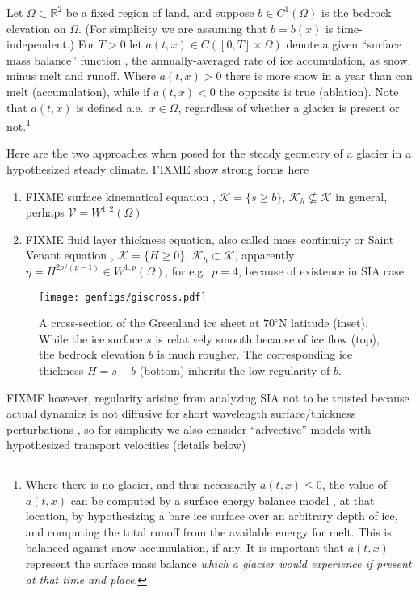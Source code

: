 \documentclass[hidelinks,onefignum,onetabnum,final]{siamart220329}  %
\newcommand{\RR}{\mathbb{R}}
\newcommand{\cK}{\mathcal{K}}
\newcommand{\cV}{\mathcal{V}}
\begin{document}
Let $\Omega \subset \RR^2$ be a fixed region of land, and suppose $b \in C^1(\Omega)$ is the bedrock elevation on $\Omega$.  (For simplicity we are assuming that $b=b(x)$ is time-independent.)  For $T>0$ let $a(t,x) \in C([0,T] \times \Omega)$ denote a given ``surface mass balance'' function \cite{GreveBlatter2009}, the annually-averaged rate of ice accumulation, as snow, minus melt and runoff.  Where $a(t,x)>0$ there is more snow in a year than can melt (accumulation), while if $a(t,x)<0$ the opposite is true (ablation).  Note that $a(t,x)$ is defined a.e.~$x\in \Omega$, regardless of whether a glacier is present or not.\footnote{Where there is no glacier, and thus necessarily $a(t,x) \le 0$, the value of $a(t,x)$ can be computed by a surface energy balance model \cite{GreveBlatter2009}, at that location, by hypothesizing a bare ice surface over an arbitrary depth of ice, and computing the total runoff from the available energy for melt.  This is balanced against snow accumulation, if any.  It is important that $a(t,x)$ represent the surface mass balance \emph{which a glacier would experience if present at that time and place}.}

Here are the two approaches when posed for the steady geometry of a glacier in a hypothesized steady climate.  FIXME show strong forms here

\begin{enumerate}
\item FIXME surface kinematical equation \cite{GreveBlatter2009}, $\cK = \{s\ge b\}$, $\cK_h \nsubseteq \cK$ in general, perhaps $\cV = W^{1,2}(\Omega)$
\item FIXME fluid layer thickness equation, also called mass continuity or Saint Venant equation \cite{JouvetBueler2012}, $\cK = \{H\ge 0\}$, $\cK_h \subset \cK$, apparently $\eta = H^{2p/(p-1)} \in W^{1,p}(\Omega)$, for e.g.~$p=4$, because of existence in SIA case \cite{JouvetBueler2012}
\end{enumerate}

\begin{figure}[ht]
\centering
\texttt{[image: genfigs/giscross.pdf]}
\caption{A cross-section of the Greenland ice sheet at $70^\circ$N latitude (inset).  While the ice surface $s$ is relatively smooth because of ice flow (top), the bedrock elevation $b$ is much rougher.  The corresponding ice thickness $H = s-b$ (bottom) inherits the low regularity of $b$.}
\label{fig:cartoon}
\end{figure}

FIXME however, regularity arising from analyzing SIA not to be trusted because actual dynamics is not diffusive for short wavelength surface/thickness perturbations \cite{Pattynetal2008}, so for simplicity we also consider ``advective'' models with hypothesized transport velocities (details below)
\end{document}
